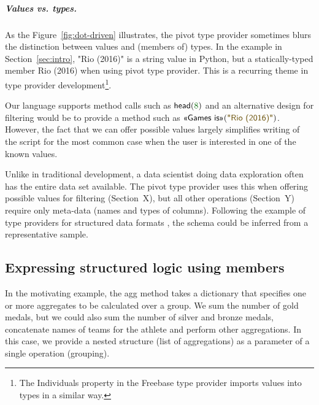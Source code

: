 \documentclass[a4paper,UKenglish]{lipics-v2016}
\theoremstyle{plain}
\theoremstyle{definition}
\newcommand{\num}[1]{\textcolor{numclr}{#1}}
\newcommand{\str}[1]{\textnormal{\textcolor{strclr}{\sffamily "#1"}}}
\newcommand{\ident}[1]{\textnormal{\sffamily #1}}
\newcommand{\qident}[1]{\textnormal{\sffamily \guillemotleft #1\guillemotright}}
\begin{document}
\subparagraph{Values vs. types.}
As the Figure~\ref{fig:dot-driven} illustrates, the pivot type provider sometimes blurs the 
distinction between values and (members of) types. In the example in Section~\ref{sec:intro},
\str{Rio (2016)} is a string value in Python, but a statically-typed member \qident{Rio (2016)}
when using pivot type provider. This is a recurring theme in type provider development\footnote{The
\ident{Individuals} property in the Freebase type provider \cite{inforich} imports values into types in a similar way.}.

Our language supports method calls such as $\ident{head}(\num{8})$ and an alternative design for
filtering would be to provide a method such as $\qident{Games is}(\str{Rio (2016)})$. However,
the fact that we can offer possible values largely simplifies writing of the script for the most 
common case when the user is interested in one of the known values.

Unlike in traditional development, a data scientist doing data exploration often has the entire 
data set available. The pivot type provider uses this when offering possible values for filtering
(Section~X), but all other operations (Section~Y) require only meta-data (names and types of 
columns). Following the example of type providers for structured data formats \cite{fsdata}, the schema could
be inferred from a representative sample.

   
\subsection{Expressing structured logic using members}
\label{sec:analysis-and}

In the motivating example, the \ident{agg} method takes a dictionary that specifies one or more 
aggregates to be calculated over a group. We sum the number of gold medals, but we could also sum
the number of silver and bronze medals, concatenate names of teams for the athlete and perform other 
aggregations. In this case, we provide a nested structure (list of aggregations) as a parameter of 
a single operation (grouping). 
\end{document}
